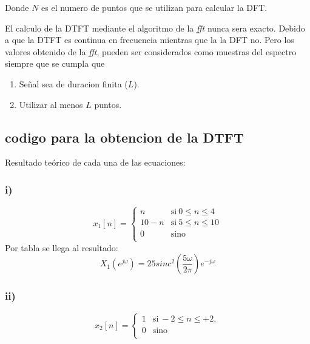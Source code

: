 \documentclass[letterpaper]{article}
\begin{document}
        Donde $N$ es el numero de puntos que se utilizan para calcular la DFT.

        El calculo de la DTFT mediante el algoritmo de la \textit{fft} nunca sera exacto. Debido a que la DTFT es continua en frecuencia 
        mientras que la la DFT no. Pero los valores obtenido de la \textit{fft}, pueden ser considerados como muestras del espectro siempre que se 
        cumpla que 

        \begin{enumerate}
            \item Señal sea de duracion finita ($L$).
            \item Utilizar al menos $L$ puntos.
        \end{enumerate}
        


    
    \subsection{codigo para la obtencion de la DTFT}
    Resultado teórico de cada una de las ecuaciones: 

    \subsubsection*{i)}
    \begin{equation}
    x_{1}[n] = \left\{ 
        \begin{array}{ll} 
        n & \mathrm{si\ } 0\leq n \leq 4 \\
        10-n & \mathrm{si\ } 5\leq n \leq 10 \\
        0 & \mathrm{sino\ } \\
        \end{array} 
        \right.
    \end{equation}
    Por tabla se llega al resultado:
    \begin{equation}
    X_{1}(e^{j \omega})=25 sinc^{2}\left(\frac{5 \omega}{2 \pi}\right) e^{- j \omega} 
    \end{equation}

    \subsubsection*{ii)}
    \begin{equation} 
        x_{2}[n] = \left\{ 
        \begin{array}{ll} 
        1 & \mathrm{si\ } -2\leq n \leq +2, \\
        0 & \mathrm{sino\ } \\
        \end{array} 
        \right.
    \end{equation}
\end{document}
